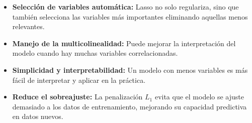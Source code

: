 \documentclass[
  letterpaper,
  DIV=11,
  numbers=noendperiod]{scrreprt}
\providecommand{\tightlist}{%
  \setlength{\itemsep}{0pt}\setlength{\parskip}{0pt}}
\begin{document}
\begin{tcolorbox}[enhanced jigsaw, breakable, toprule=.15mm, bottomtitle=1mm, coltitle=black, colbacktitle=quarto-callout-note-color!10!white, titlerule=0mm, opacitybacktitle=0.6, bottomrule=.15mm, toptitle=1mm, title=\textcolor{quarto-callout-note-color}{\faInfo}\hspace{0.5em}{Propiedades Clave}, arc=.35mm, rightrule=.15mm, opacityback=0, colframe=quarto-callout-note-color-frame, leftrule=.75mm, left=2mm, colback=white]

\begin{itemize}
\tightlist
\item
  \textbf{Selección de variables automática:} Lasso no solo regulariza,
  sino que también selecciona las variables más importantes eliminando
  aquellas menos relevantes.
\item
  \textbf{Manejo de la multicolinealidad:} Puede mejorar la
  interpretación del modelo cuando hay muchas variables correlacionadas.
\item
  \textbf{Simplicidad y interpretabilidad:} Un modelo con menos
  variables es más fácil de interpretar y aplicar en la práctica.
\item
  \textbf{Reduce el sobreajuste:} La penalización \(L_1\) evita que el
  modelo se ajuste demasiado a los datos de entrenamiento, mejorando su
  capacidad predictiva en datos nuevos.
\end{itemize}

\end{tcolorbox}
\end{document}
